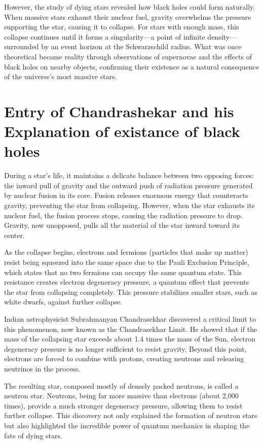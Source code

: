 \documentclass[12pt,a4paper]{article}
\begin{document}
However, the study of dying stars revealed how black holes could form naturally. When massive stars exhaust their nuclear fuel, gravity overwhelms the pressure supporting the star, causing it to collapse. For stars with enough mass, this collapse continues until it forms a singularity—a point of infinite density—surrounded by an event horizon at the Schwarzschild radius. What was once theoretical became reality through observations of supernovae and the effects of black holes on nearby objects, confirming their existence as a natural consequence of the universe's most massive stars.

\section{Entry of Chandrashekar and his Explanation of existance of black holes}
During a star's life, it maintains a delicate balance between two opposing forces: the inward pull of gravity and the outward push of radiation pressure generated by nuclear fusion in its core. Fusion releases enormous energy that counteracts gravity, preventing the star from collapsing. However, when the star exhausts its nuclear fuel, the fusion process stops, causing the radiation pressure to drop. Gravity, now unopposed, pulls all the material of the star inward toward its center.

As the collapse begins, electrons and fermions (particles that make up matter) resist being squeezed into the same space due to the Pauli Exclusion Principle, which states that no two fermions can occupy the same quantum state. This resistance creates electron degeneracy pressure, a quantum effect that prevents the star from collapsing completely. This pressure stabilizes smaller stars, such as white dwarfs, against further collapse.

Indian astrophysicist Subrahmanyan Chandrasekhar discovered a critical limit to this phenomenon, now known as the Chandrasekhar Limit. He showed that if the mass of the collapsing star exceeds about 1.4 times the mass of the Sun, electron degeneracy pressure is no longer sufficient to resist gravity. Beyond this point, electrons are forced to combine with protons, creating neutrons and releasing neutrinos in the process.

The resulting star, composed mostly of densely packed neutrons, is called a neutron star. Neutrons, being far more massive than electrons (about 2,000 times), provide a much stronger degeneracy pressure, allowing them to resist further collapse. This discovery not only explained the formation of neutron stars but also highlighted the incredible power of quantum mechanics in shaping the fate of dying stars.
\end{document}
